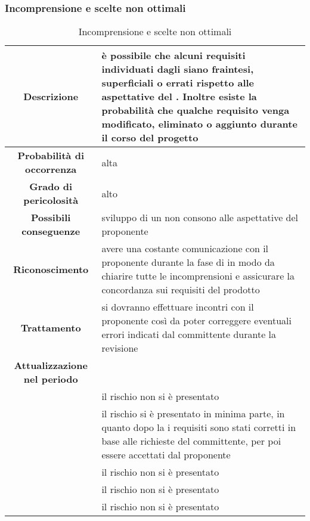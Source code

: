 \documentclass[PianoDiProgetto.tex]{subfiles}
\begin{document}
		\subsubsection{Incomprensione e scelte non ottimali}
			\label{sec:lr}
\begin{table}[h]
		\begin{center}
			\begin{tabular}{ | c | p{10cm} |}
				\hline


		 \textbf{Descrizione} & è possibile che alcuni requisiti individuati dagli \ANP{} siano fraintesi, superficiali o errati rispetto alle aspettative del \gl{proponente} \PROPONENTE{}. Inoltre esiste la probabilità che qualche requisito venga modificato, eliminato o aggiunto durante il corso del progetto \\ \hline
		 \textbf{Probabilità di occorrenza} & alta \\ \hline
		 \textbf{Grado di pericolosità} & alto \\ \hline
		 \textbf{Possibili conseguenze} & sviluppo di un \gl{prodotto} non consono alle aspettative del proponente \\ \hline
		 \textbf{Riconoscimento} & avere una costante comunicazione con il proponente \PROPONENTE{} durante la fase di \ARdoc{} in modo da chiarire tutte le incomprensioni e assicurare la concordanza sui requisiti del prodotto \\ \hline
		 \textbf{Trattamento} & si dovranno effettuare incontri con il proponente \PROPONENTE{} così da poter correggere eventuali errori indicati dal committente durante la revisione \\ \hline
		 \textbf{Attualizzazione nel periodo}&

				\\ \hline \textbf{\PerAR} & il rischio non si è presentato
				\\ \hline \textbf{\PerAD}& il rischio si è presentato in minima parte, in quanto dopo la  \RR{} i requisiti sono stati corretti in base alle richieste del committente, per poi essere accettati dal proponente
				\\ \hline \textbf{\PerPA}& il rischio non si è presentato
				\\ \hline \textbf{\PerPD}& il rischio non si è presentato
				\\ \hline \textbf{\PerC}& il rischio non si è presentato \\ \hline

\end{tabular}
		\caption{Incomprensione e scelte non ottimali}
		\end{center}
	\end{table}
\end{document}
